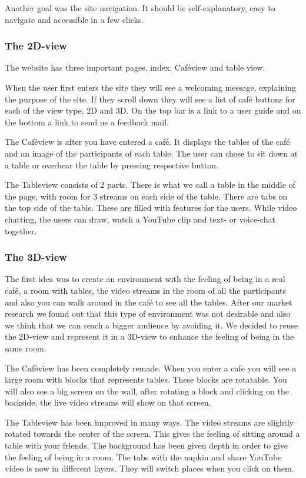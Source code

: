 \documentclass[12pt, titlepage]{article}
\begin{document}
Another goal was the site navigation. It should be self-explanatory, easy to navigate and accessible in a few clicks.
\subsubsection{The 2D-view}
The website has three important pages, index, Caféview and table view.

When the user first enters the site they will see a welcoming message, explaining the purpose of the site. If they scroll down they will see a list of café buttons for each of the view type, 2D and 3D. On the top bar is a link to a user guide and on the bottom a link to send us a feedback mail.

The Caféview is after you have entered a café. It displays the tables of the café and an image of the participants of each table. The user can chose to sit down at a table or overhear the table by pressing respective button.

The Tableview consists of 2 parts. There is what we call a table in the middle of the page, with room for 3 streams on each side of the table. There are tabs on the top side of the table. These are filled with features for the users. While video chatting, the users can draw, watch a YouTube clip and text- or voice-chat together. 
\subsubsection{The 3D-view}
The first idea was to create an environment with the feeling of being in a real café, a room with tables, the video streams in the room of all the participants and also you can walk around in the café to see all the tables. After our market research we found out that this type of environment was not desirable and also we think that we can reach a bigger audience by avoiding it. We decided to reuse the 2D-view and represent it in a 3D-view to enhance the feeling of being in the same room. 

The Caféview has been completely remade. When you enter a cafe you will see a large room with blocks that represents tables. These blocks are rotatable. You will also see a big screen on the wall, after rotating a block and clicking on the backside,  the live video streams will show on that screen.

The Tableview has been improved in many ways. The video streams are slightly rotated towards the center of the screen. This gives the feeling of sitting around a table with your friends. The background has been given depth in order to give the feeling of being in a room. The tabs with the napkin and share YouTube video is now in different layers. They will switch places when you click on them.
\end{document}
